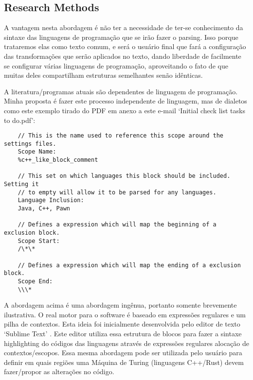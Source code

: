 \begin{englishtext}
\subsection{Research Methods}

    A vantagem nesta abordagem é não ter a necessidade de ter-se conhecimento da sintaxe das
    linguagens de programação que se irão fazer o parsing. Isso porque trataremos elas como texto
    comum, e será o usuário final que fará a configuração das transformações que serão aplicados no
    texto, dando liberdade de facilmente se configurar várias linguagens de programação,
    aproveitando o fato de que muitas deles compartilham estruturas semelhantes senão idênticas.

    A literatura/programas atuais são dependentes de linguagem de programação. Minha proposta é
    fazer este processo independente de linguagem, mas de dialetos como este exemplo tirado do PDF
    em anexo a este e-mail `Initial check list tasks to do.pdf':

    \begin{lstlisting}
    // This is the name used to reference this scope around the settings files.
    Scope Name:
    %c++_like_block_comment

    // This set on which languages this block should be included. Setting it
    // to empty will allow it to be parsed for any languages.
    Language Inclusion:
    Java, C++, Pawn

    // Defines a expression which will map the beginning of a exclusion block.
    Scope Start:
    /\*\*

    // Defines a expression which will map the ending of a exclusion block.
    Scope End:
    \\\*
    \end{lstlisting}
    \vspace*{-4mm}

    A abordagem acima é uma abordagem ingênua, portanto somente brevemente ilustrativa. O real motor
    para o software é baseado em expressões regulares e um pilha de contextos. Esta ideia foi
    inicialmente desenvolvida pelo editor de texto `Sublime Text' \cite{Skinner}. Este editor
    utiliza essa estrutura de blocos para fazer a sintaxe highlighting do códigos das linguagens
    através de expressões regulares alocação de contextos/escopos. Essa mesma abordagem pode ser
    utilizada pelo usuário para definir em quais regiões uma Máquina de Turing (linguagens C++/Rust)
    devem fazer/propor as alterações no código.



\end{englishtext}
